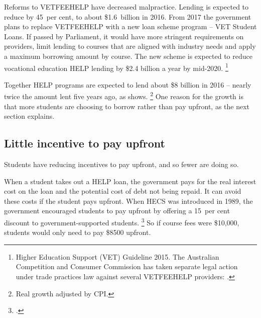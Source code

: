 \documentclass[embargoed]{grattan}
\begin{document}
Reforms to \gls{VETFEEHELP} have decreased malpractice.
Lending is expected to reduce by 45~per cent, to about \$1.6~billion in 2016.
From 2017 the government plans to replace \gls{VETFEEHELP} with a new loan scheme program -- VET Student Loans.
If passed by Parliament, it would have more stringent requirements on providers, limit lending to courses that are aligned with industry needs and apply a maximum borrowing amount by course.
The new scheme is expected to reduce vocational education \gls{HELP} lending by \$2.4 billion a year by mid-2020.%
\footnote{Higher Education Support (VET) Guideline 2015.
The Australian Competition and Consumer Commission has taken separate legal action under trade practices law against several \gls{VETFEEHELP} providers: \textcites{Birmingham2016MediareleaseNew}{ACCC2015ACCCtakesaction}.}

Together \gls{HELP} programs are expected to lend about \$8 billion in 2016 -- nearly twice the amount lent five years ago, as  shows.%
\footnote{Real growth adjusted by \gls{CPI}.} 
One reason for the growth is that more students are choosing to borrow rather than pay upfront, as the next section explains.

\subsection{Little incentive to pay upfront}\label{subsec:little-incentive-to-pay-upfront}

Students have reducing incentives to pay upfront, and so fewer are doing so.

When a student takes out a \gls{HELP} loan, the government pays for the real interest cost on the loan and the potential cost of debt not being repaid.
It can avoid these costs if the student pays upfront.
When \gls{HECS} was introduced in 1989, the government encouraged students to pay upfront by offering a 15~per cent discount to government-supported students.%
\footcite[][79]{Wran1988ReportCommitteeHigher} 
So if course fees were \$10,000, students would only need to pay \$8500 upfront.
\end{document}

